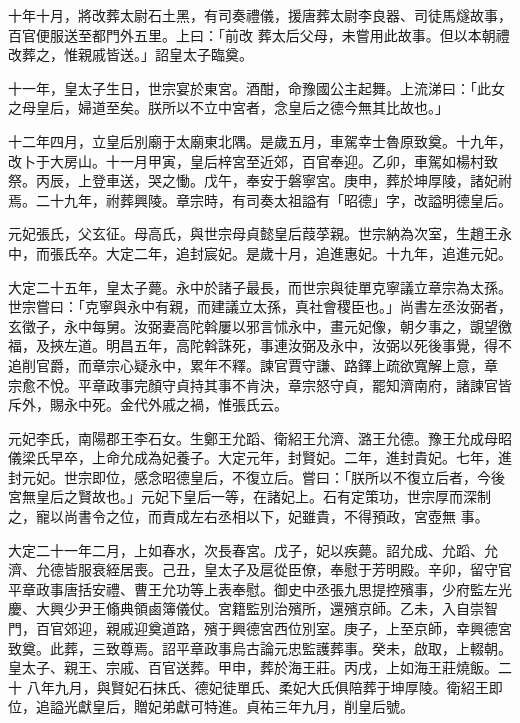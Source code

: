 \begin{pinyinscope}
 十年十月，將改葬太尉石土黑，有司奏禮儀，援唐葬太尉李良器、司徒馬燧故事，百官便服送至都門外五里。上曰：「前改
 葬太后父母，未嘗用此故事。但以本朝禮改葬之，惟親戚皆送。」詔皇太子臨奠。



 十一年，皇太子生日，世宗宴於東宮。酒酣，命豫國公主起舞。上流涕曰：「此女之母皇后，婦道至矣。朕所以不立中宮者，念皇后之德今無其比故也。」



 十二年四月，立皇后別廟于太廟東北隅。是歲五月，車駕幸士魯原致奠。十九年，改卜于大房山。十一月甲寅，皇后梓宮至近郊，百官奉迎。乙卯，車駕如楊村致祭。丙辰，上登車送，哭之慟。戊午，奉安于磐寧宮。庚申，葬於坤厚陵，諸妃祔焉。二十九年，祔葬興陵。章宗時，有司奏太祖謚有「昭德」字，改謚明德皇后。



 元妃張氏，父玄征。母高氏，與世宗母貞懿皇后葭莩親。世宗納為次室，生趙王永中，而張氏卒。大定二年，追封宸妃。是歲十月，追進惠妃。十九年，追進元妃。



 大定二十五年，皇太子薨。永中於諸子最長，而世宗與徒單克寧議立章宗為太孫。世宗嘗曰：「克寧與永中有親，而建議立太孫，真社會稷臣也。」尚書左丞汝弼者，玄徵子，永中每舅。汝弼妻高陀斡屢以邪言怵永中，畫元妃像，朝夕事之，覬望徼福，及挾左道。明昌五年，高陀斡誅死，事連汝弼及永中，汝弼以死後事覺，得不追削官爵，而章宗心疑永中，累年不釋。諫官賈守謙、路鐸上疏欲寬解上意，章
 宗愈不悅。平章政事完顏守貞持其事不肯決，章宗怒守貞，罷知濟南府，諸諫官皆斥外，賜永中死。金代外戚之禍，惟張氏云。



 元妃李氏，南陽郡王李石女。生鄭王允蹈、衛紹王允濟、潞王允德。豫王允成母昭儀梁氏早卒，上命允成為妃養子。大定元年，封賢妃。二年，進封貴妃。七年，進封元妃。世宗即位，感念昭德皇后，不復立后。嘗曰：「朕所以不復立后者，今後宮無皇后之賢故也。」元妃下皇后一等，在諸妃上。石有定策功，世宗厚而深制之，寵以尚書令之位，而責成左右丞相以下，妃雖貴，不得預政，宮壺無
 事。



 大定二十一年二月，上如春水，次長春宮。戊子，妃以疾薨。詔允成、允蹈、允濟、允德皆服衰絰居喪。己丑，皇太子及扈從臣僚，奉慰于芳明殿。辛卯，留守官平章政事唐括安禮、曹王允功等上表奉慰。御史中丞張九思提控殯事，少府監左光慶、大興少尹王翛典領鹵簿儀仗。宮籍監別治殯所，還殯京師。乙未，入自崇智門，百官郊迎，親戚迎奠道路，殯于興德宮西位別室。庚子，上至京師，幸興德宮致奠。此葬，三致尊焉。詔平章政事烏古論元忠監護葬事。癸未，啟取，上輟朝。皇太子、親王、宗戚、百官送葬。甲申，葬於海王莊。丙戌，上如海王莊燒飯。二十
 八年九月，與賢妃石抹氏、德妃徒單氏、柔妃大氏俱陪葬于坤厚陵。衛紹王即位，追謚光獻皇后，贈妃弟獻可特進。貞祐三年九月，削皇后號。




\end{pinyinscope}
